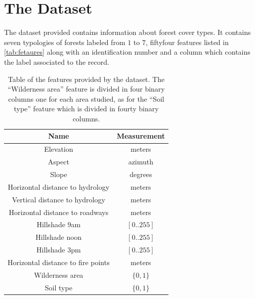 
\chapter{The Dataset}
The dataset provided contains information about forest cover types. It contains seven typologies of forests labeled from $1$ to $7$, fiftyfour features listed in \autoref{tab:fetaures} along with an identification number and a column which contains the label associated to the record.
\begin{table}[htpb]
	\centering
\begin{tabular}{|c|c|}
	\hline 
	\textbf{Name} & \textbf{Measurement} \\ 
	\hline 
	Elevation & meters \\ 
	\hline 
	Aspect & azimuth \\ 
	\hline 
	Slope & degrees \\ 
	\hline 
	Horizontal distance to hydrology & meters \\ 
	\hline 
	Vertical distance to hydrology & meters \\ 
	\hline 
	Horizontal distance to roadways & meters \\ 
	\hline 
	Hillshade 9am & $[0..255]$ \\ 
	\hline 
	Hillshade noon & $[0..255]$ \\ 
	\hline 
	Hillshade 3pm & $[0..255]$ \\ 
	\hline 
	Horizontal distance to fire points & meters \\ 
	\hline 
	Wilderness area & $\lbrace0, 1\rbrace$ \\ 
	\hline 
	Soil type & $\lbrace0, 1\rbrace$ \\ 
	\hline 
\end{tabular}
\caption{Table of the features provided by the dataset. The ``Wilderness area'' feature is divided in four binary columns one for each area studied, as for the ``Soil type'' feature which is divided in fourty binary columns.}
\label{tab:fetaures}
\end{table}

